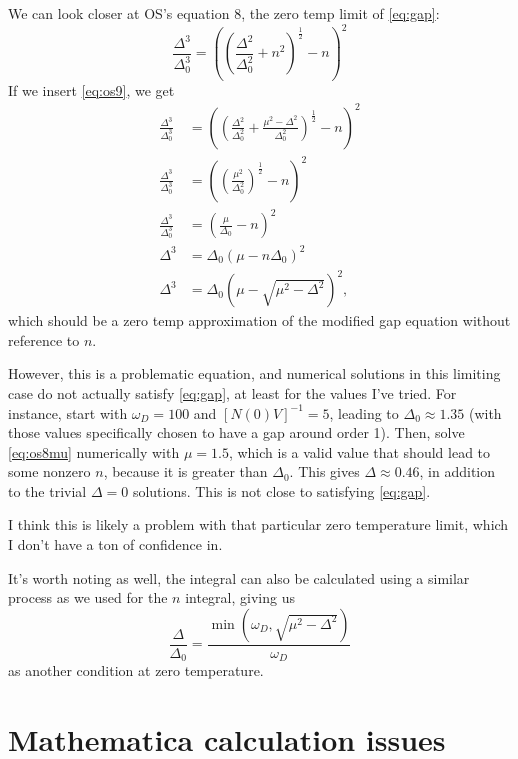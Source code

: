 \documentclass{article}
\newcommand{\corr}{\mu}
\begin{document}
We can look closer at OS's equation 8, the zero temp limit of \cref{eq:gap}:
\begin{equation}
	\frac{\Delta^3}{\Delta_0^3} = \left(\left(\frac{\Delta^2}{\Delta_0^2} + n^2\right)^{\frac12} - n \right)^2
\end{equation}
If we insert \cref{eq:os9}, we get
\begin{align}
	\frac{\Delta^3}{\Delta_0^3} &= \left(\left(\frac{\Delta^2}{\Delta_0^2} + \frac{\corr^2 - \Delta^2}{\Delta_0^2}\right)^{\frac12} - n \right)^2 \\
	\frac{\Delta^3}{\Delta_0^3} &= \left(\left(\frac{\corr^2}{\Delta_0^2}\right)^{\frac12} - n \right)^2 \\
	\frac{\Delta^3}{\Delta_0^3} &= \left(\frac{\corr}{\Delta_0} - n \right)^2 \\
	\Delta^3 &= \Delta_0 \left(\corr - n \Delta_0 \right)^2 \\
	\Delta^3 &= \Delta_0 \left(\corr - \sqrt{\corr^2 - \Delta^2}\right)^2, \label{eq:os8mu}
\end{align}
which should be a zero temp approximation of the modified gap equation without reference to $n$.

However, this is a problematic equation, and numerical solutions in this limiting case do not actually satisfy \cref{eq:gap}, at least for the values I've tried.
For instance, start with $\omega_D = 100$ and $\left[ N(0) V \right]^{-1} = 5$, leading to $\Delta_0 \approx 1.35$ (with those values specifically chosen to have a gap around order 1).
Then, solve \cref{eq:os8mu} numerically with $\corr = 1.5$, which is a valid value that should lead to some nonzero $n$, because it is greater than $\Delta_0$.
This gives $\Delta \approx 0.46$, in addition to the trivial $\Delta = 0$ solutions.
This is not close to satisfying \cref{eq:gap}.

I think this is likely a problem with that particular zero temperature limit, which I don't have a ton of confidence in.

It's worth noting as well, the integral can also be calculated using a similar process as we used for the $n$ integral, giving us
\begin{equation}
	\frac{\Delta}{\Delta_0} = \frac{\min(\omega_D, \sqrt{\corr^2 - \Delta^2})}{\omega_D}
\end{equation}
as another condition at zero temperature.

\section{Mathematica calculation issues}
\end{document}
